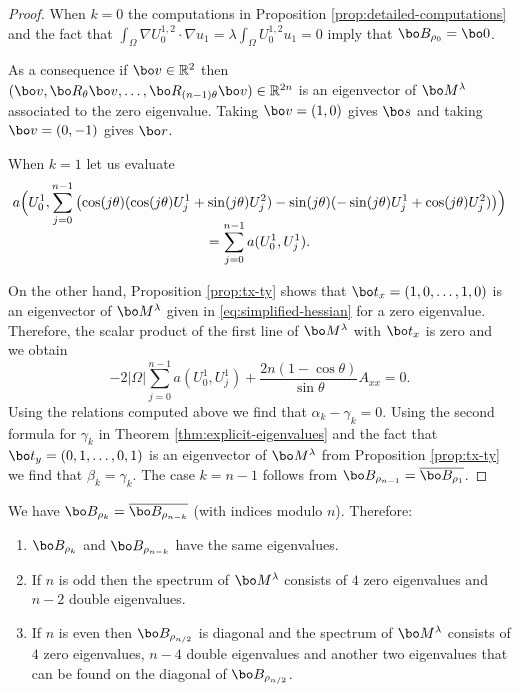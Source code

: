 \begin{proof}
When $k=0$ the computations in Proposition \ref{prop:detailed-computations} and the fact that $\int_\Omega \nabla U_0^{1,2} \cdot \nabla u_1 = \lambda \int_\Omega U_0^{1,2} u_1 = 0$ imply that $\bo B_{\rho_0} = \bo 0$.

As a consequence if $\bo v \in \Bbb{R}^2$ then $(\bo v,\bo R_\theta\bo v,\dots,\bo R_{(n-1)\theta}\bo v) \in \Bbb{R}^{2n}$ is an eigenvector of $\bo M^{\lambda}$ associated to the zero eigenvalue. Taking $\bo v = (1,0)$ gives $\bo s$ and taking $\bo v = (0,-1)$ gives $\bo r$.

When $k=1$ let us evaluate
\vspace*{-5pt}
\begin{multline*}
a\Bigl(U_0^1,\sum_{j=0}^{n-1} \left(\cos(j\theta)(\cos(j\theta) U_j^1+\sin(j\theta)U_j^2) - \sin(j\theta)(-\sin (j\theta)U_j^1+\cos(j\theta)U_j^2)\right) \Bigr)\\[-8pt]
=\sum_{j=0}^{n-1} a(U_0^1,U_j^1).
\end{multline*}

On the other hand, Proposition \ref{prop:tx-ty} shows that $\bo t_x=(1,0,\dots,1,0)$ is an eigenvector of $\bo M^\lambda$ given in \ref{eq:simplified-hessian} for a zero eigenvalue. Therefore, the scalar product of the first line of $\bo M^\lambda$ with $\bo t_x$ is zero and we obtain
\[
-2|\Omega| \sum_{j=0}^{n-1} a(U_0^1,U_j^1) +\frac{2n(1-\cos \theta)}{\sin \theta} A_{xx} = 0.
\]
Using the relations computed above we find that $\alpha_k-\gamma_k=0$.
Using the second formula for $\gamma_k$ in Theorem \ref{thm:explicit-eigenvalues} and the fact that $\bo t_y= (0,1,\dots,0,1)$ is an eigenvector of $\bo M^\lambda$ from Proposition \ref{prop:tx-ty} we find that $\beta_k = \gamma_k$. The case $k=n-1$ follows from $\bo B_{\rho_{n-1}} = \overline{\bo B_{\rho_1}}$.
\end{proof}

\begin{cor}
We have $\bo B_{\rho_k} = \overline{\bo B_{\rho_{n-k}}}$ (with indices modulo $n$). Therefore:
\begin{enumerate}
\item
$\bo B_{\rho_k}$ and $\bo B_{\rho_{n-k}}$ have the same eigenvalues.

\item
If $n$ is odd then the spectrum of $\bo M^\lambda$ consists of $4$ zero eigenvalues and $n-2$ double eigenvalues.

\item
If $n$ is even then $\bo B_{\rho_{n/2}}$ is diagonal and the spectrum of $\bo M^\lambda$ consists of $4$ zero eigenvalues, $n-4$ double eigenvalues and another two eigenvalues that can be found on the diagonal of $\bo B_{\rho_{n/2}}$.
\end{enumerate}
\end{cor}


